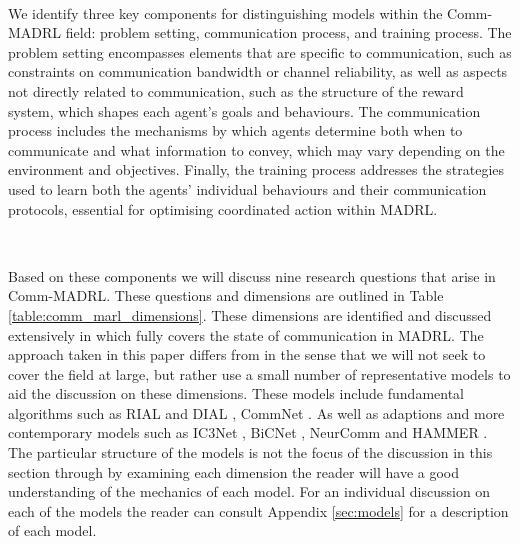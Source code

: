 \documentclass{article}
\begin{document}
\

We identify three key components for distinguishing models within the Comm-MADRL field: problem setting, communication process, and training process. The problem setting encompasses elements that are specific to communication, such as constraints on communication bandwidth or channel reliability, as well as aspects not directly related to communication, such as the structure of the reward system, which shapes each agent's goals and behaviours. The communication process includes the mechanisms by which agents determine both when to communicate and what information to convey, which may vary depending on the environment and objectives. Finally, the training process addresses the strategies used to learn both the agents' individual behaviours and their communication protocols, essential for optimising coordinated action within MADRL.

\

Based on these components we will discuss nine research questions that arise in Comm-MADRL. These questions and dimensions are outlined in Table \ref{table:comm_marl_dimensions}. These dimensions are identified and discussed extensively in \citet{zhu2024survey} which fully covers the state of communication in MADRL. The approach taken in this paper differs from \citet{zhu2024survey} in the sense that we will not seek to cover the field at large, but rather use a small number of representative models to aid the discussion on these dimensions. These models include fundamental algorithms such as RIAL and DIAL \citep{foerster2016learning}, CommNet \citep{sukhbaatar2016commnet}. As well as adaptions and more contemporary models such as IC3Net \citep{singh2018ic3net}, BiCNet \citep{peng2017bicnet}, NeurComm \citep{chu2020NeurComm} and HAMMER \citep{gupta2022HAMMER}. The particular structure of the models is not the focus of the discussion in this section through by examining each dimension the reader will have a good understanding of the mechanics of each model. For an individual discussion on each of the models the reader can consult Appendix \ref{sec:models} for a description of each model.
\end{document}
